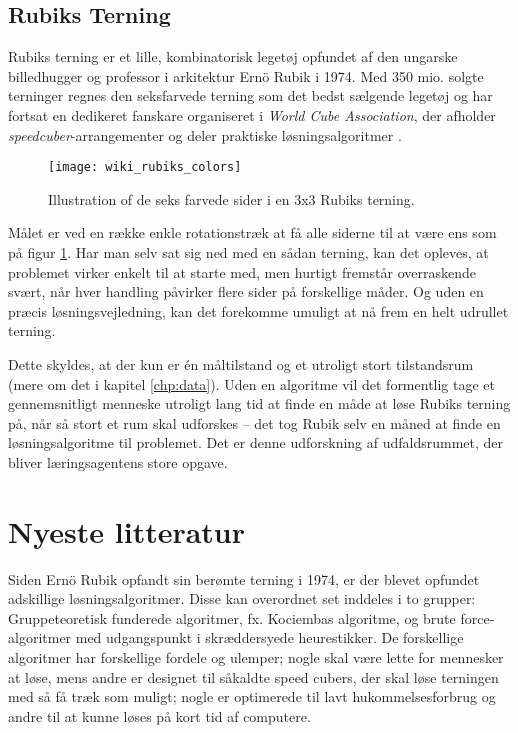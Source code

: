 \documentclass[../main.tex]{subfiles}
\begin{document}
\subsection*{Rubiks Terning}

Rubiks terning er et lille, kombinatorisk legetøj opfundet af den ungarske billedhugger og professor i arkitektur Ernö Rubik i 1974. Med 350 mio. solgte terninger regnes den seksfarvede terning som det bedst sælgende legetøj og har fortsat en dedikeret fanskare organiseret i \textit{World Cube Association}, der afholder \textit{speedcuber}-arrangementer og deler praktiske løsningsalgoritmer \cite{RubiksWiki}. 
\begin{figure}[H]
	\centering 
	\texttt{[image: wiki\_rubiks\_colors]}
	\caption{Illustration of de seks farvede sider i en 3x3 Rubiks terning.\protect\footnotemark}\label{fig:rubcolours}
\end{figure}
\noindent Målet er ved en række enkle rotationstræk at få alle siderne til at være ens som på figur \ref{fig:rubcolours}. 
Har man selv sat sig ned med en sådan terning, kan det opleves, at problemet virker enkelt til at starte med, men hurtigt fremstår overraskende svært, når hver handling påvirker flere sider på forskellige måder. Og uden en præcis løsningsvejledning, kan det forekomme umuligt at nå frem en helt udrullet terning.

Dette skyldes, at der kun er én måltilstand og et utroligt stort tilstandsrum (mere om det i kapitel \ref{chp:data}).
Uden en algoritme vil det formentlig tage et gennemsnitligt menneske utroligt lang tid at finde en måde at løse Rubiks terning på, når så stort et rum skal udforskes -- det tog Rubik selv en måned at finde en 
løsningsalgoritme til problemet. 
Det er denne udforskning af udfaldsrummet, der bliver læringsagentens store opgave. 



\section{Nyeste litteratur}

Siden Ernö Rubik opfandt sin berømte terning i 1974, er der blevet opfundet adskillige løsningsalgoritmer.
Disse kan overordnet set inddeles i to grupper:
Gruppeteoretisk funderede algoritmer, fx. Kociembas algoritme, og brute force-algoritmer med udgangspunkt i skræddersyede heurestikker.
De forskellige algoritmer har forskellige fordele og ulemper;
nogle skal være lette for mennesker at løse, mens andre er designet til såkaldte speed cubers, der skal løse terningen med så få træk som muligt;
nogle er optimerede til lavt hukommelsesforbrug og andre til at kunne løses på kort tid af computere. 
\end{document}
